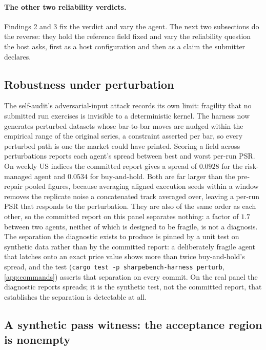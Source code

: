 \paragraph*{The other two reliability verdicts.} Findings 2 and 3 fix the verdict and vary the agent. The next two subsections do the reverse: they hold the reference field fixed and vary the reliability question the host asks, first as a host configuration and then as a claim the submitter declares.






\subsection{Robustness under perturbation}\label{sec:perturb}

The self-audit's adversarial-input attack records its own limit: fragility that no submitted run exercises is invisible to a deterministic kernel. The harness now generates perturbed datasets whose bar-to-bar moves are nudged within the empirical range of the original series, a constraint asserted per bar, so every perturbed path is one the market could have printed. Scoring a field across perturbations reports each agent's spread between best and worst per-run PSR. On weekly US indices the committed report gives a spread of $0.0928$ for the risk-managed agent and $0.0534$ for buy-and-hold. Both are far larger than the pre-repair pooled figures, because averaging aligned execution seeds within a window removes the replicate noise a concatenated track averaged over, leaving a per-run PSR that responds to the perturbation. They are also of the same order as each other, so the committed report on this panel separates nothing: a factor of $1.7$ between two agents, neither of which is designed to be fragile, is not a diagnosis. The separation the diagnostic exists to produce is pinned by a unit test on synthetic data rather than by the committed report: a deliberately fragile agent that latches onto an exact price value shows more than twice buy-and-hold's spread, and the test (\texttt{cargo test -p sharpebench-harness perturb}, \cref{app:commands}) asserts that separation on every commit. On the real panel the diagnostic reports spreads; it is the synthetic test, not the committed report, that establishes the separation is detectable at all.

\subsection{A synthetic pass witness: the acceptance region is nonempty}\label{sec:witness}

